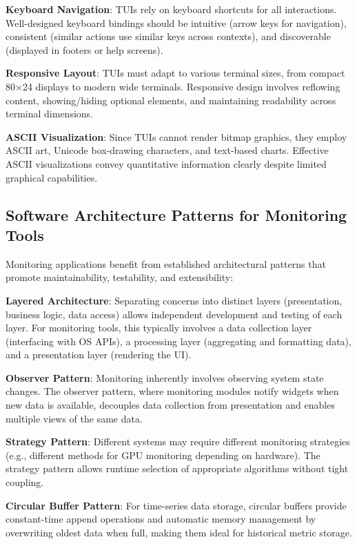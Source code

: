 \documentclass[12pt,a4paper,oneside]{report}
\begin{document}
\textbf{Keyboard Navigation}: TUIs rely on keyboard shortcuts for all interactions. Well-designed keyboard bindings should be intuitive (arrow keys for navigation), consistent (similar actions use similar keys across contexts), and discoverable (displayed in footers or help screens).

\textbf{Responsive Layout}: TUIs must adapt to various terminal sizes, from compact 80×24 displays to modern wide terminals. Responsive design involves reflowing content, showing/hiding optional elements, and maintaining readability across terminal dimensions.

\textbf{ASCII Visualization}: Since TUIs cannot render bitmap graphics, they employ ASCII art, Unicode box-drawing characters, and text-based charts. Effective ASCII visualizations convey quantitative information clearly despite limited graphical capabilities.

\subsection{Software Architecture Patterns for Monitoring Tools}

Monitoring applications benefit from established architectural patterns that promote maintainability, testability, and extensibility:

\textbf{Layered Architecture}: Separating concerns into distinct layers (presentation, business logic, data access) allows independent development and testing of each layer. For monitoring tools, this typically involves a data collection layer (interfacing with OS APIs), a processing layer (aggregating and formatting data), and a presentation layer (rendering the UI).

\textbf{Observer Pattern}: Monitoring inherently involves observing system state changes. The observer pattern, where monitoring modules notify widgets when new data is available, decouples data collection from presentation and enables multiple views of the same data.

\textbf{Strategy Pattern}: Different systems may require different monitoring strategies (e.g., different methods for GPU monitoring depending on hardware). The strategy pattern allows runtime selection of appropriate algorithms without tight coupling.

\textbf{Circular Buffer Pattern}: For time-series data storage, circular buffers provide constant-time append operations and automatic memory management by overwriting oldest data when full, making them ideal for historical metric storage.
\end{document}

